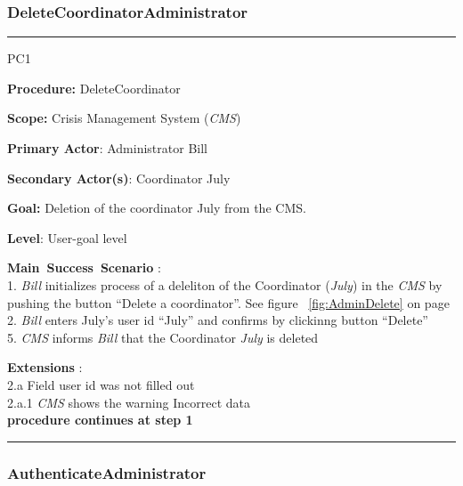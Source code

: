 \subsubsection{DeleteCoordinatorAdministrator}

\vspace{0.5cm}
\hrule
\begin{lyxlist}{PC1}
\small{
\item [\textbf{Procedure:}] DeleteCoordinator
\item [\textbf{Scope:}] Crisis Management System (\emph{CMS})
\item [\textbf{Primary Actor}:] Administrator Bill
\item [\textbf{Secondary Actor(s)}:] Coordinator July
\item [\textbf{Goal:}] Deletion of the coordinator July from the CMS.
\item [\textbf{Level}:] User-goal level
\item [\textbf{Main~Success~Scenario}]:\\
1. \emph{Bill} initializes process of a deleliton of the Coordinator
(\emph{July}) in the \emph{CMS} by pushing the button ``Delete a coordinator''.
See figure ~\ref{fig:AdminDelete} on page~\pageref{fig:AdminDelete}\\
2. \emph{Bill} enters July's user id ``July'' and confirms by clickinng button
``Delete''\\
5. \emph{CMS} informs \emph{Bill} that the Coordinator \emph{July} is deleted

\item [\textbf{Extensions}]:\\
2.a Field user id was not filled out\\
\hspace*{0.5cm} 2.a.1 \emph{CMS} shows the warning Incorrect data\\
\hspace*{0.5cm} \textbf{procedure continues at step 1}

}
\end{lyxlist}
\hrule
\vspace{0.5cm}


\subsubsection{AuthenticateAdministrator}

